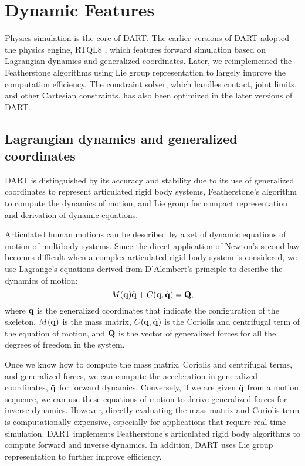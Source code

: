 \section{Dynamic Features}
Physics simulation is the core of DART. The earlier versions of DART
adopted the physics engine, RTQL8 \cite{}, which features forward
simulation based on Lagrangian dynamics
and generalized coordinates. Later, we reimplemented the Featherstone
algorithms using Lie group representation to largely improve the
computation efficiency. The constraint solver, which handles contact,
joint limits, and other Cartesian constraints, has also been optimized
in the later versions of DART. 

\subsection{Lagrangian dynamics and generalized coordinates}
DART is distinguished by its accuracy and stability due to its use of
generalized coordinates to represent articulated rigid body systems,
Featherstone’s algorithm to compute the dynamics of
motion, and Lie group for compact representation and derivation of
dynamic equations.

Articulated human motions can be described by a set of dynamic
equations of motion of multibody systems. Since the direct application
of Newton’s second law becomes difficult when a complex articulated
rigid body system is considered, we use Lagrange’s equations derived
from D'Alembert’s principle to describe the dynamics of motion: 
\begin{equation}
M(\mathbf{q})\ddot{\mathbf{q}} + C(\mathbf{q}, \dot{\mathbf{q}}) = \mathbf{Q},
\end{equation}
where $\mathbf{q}$ is the generalized coordinates that indicate the 
configuration of the skeleton. $M(\mathbf{q})$ is the mass matrix,
$C(\mathbf{q},\dot{\mathbf{q}})$ is the Coriolis and centrifugal term of the
equation of motion, and $\mathbf{Q}$ is the vector of generalized forces
for all the degrees of freedom in the system.

Once we know how to compute the mass matrix, Coriolis and centrifugal
terms, and generalized forces, we can compute the acceleration in
generalized coordinates, $\ddot{\mathbf{q}}$ for forward dynamics. Conversely, if we
are given $\ddot{\mathbf{q}}$ from a motion sequence, we can use these equations of
motion to derive generalized forces for inverse dynamics. However,
directly evaluating the mass matrix and Coriolis term is 
computationally expensive, especially for applications that require
real-time simulation. DART implements Featherstone's articulated rigid
body algorithms to compute forward and inverse dynamics. In addition,
DART uses Lie group representation to further improve efficiency.

